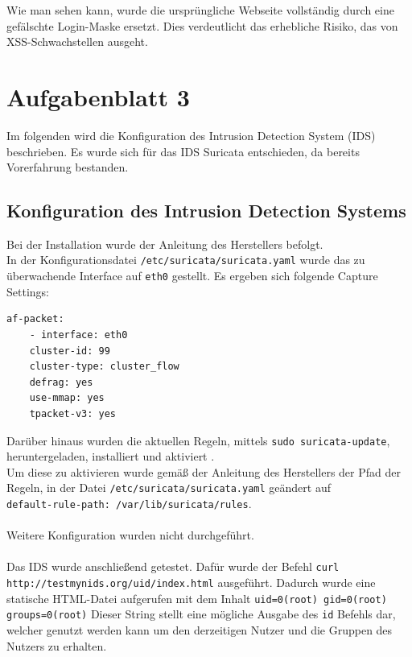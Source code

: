 \documentclass[
    a4paper,
    pagesize,
	pdftex,
    12pt,
]{scrartcl}
\begin{document}
\noindent Wie man sehen kann, wurde die ursprüngliche Webseite vollständig durch eine gefälschte Login-Maske ersetzt. Dies verdeutlicht das erhebliche Risiko, das von XSS-Schwachstellen ausgeht.

\FloatBarrier

\newpage
\section{Aufgabenblatt 3}
Im folgenden wird die Konfiguration des Intrusion Detection System (IDS) beschrieben. Es wurde sich für das IDS Suricata entschieden, da bereits Vorerfahrung bestanden.

\subsection{Konfiguration des Intrusion Detection Systems}\label{config-ids}
Bei der Installation wurde der Anleitung des Herstellers \cite{suricata-quickstart} befolgt. \\
In der Konfigurationsdatei \lstinline[breaklines]|/etc/suricata/suricata.yaml| wurde das zu überwachende Interface auf \lstinline[breaklines]|eth0| gestellt. Es ergeben sich folgende Capture Settings:
\begin{lstlisting}[breaklines]
	af-packet:
	- interface: eth0
	cluster-id: 99
	cluster-type: cluster_flow
	defrag: yes
	use-mmap: yes
	tpacket-v3: yes
\end{lstlisting}
Darüber hinaus wurden die aktuellen Regeln,  mittels \lstinline[breaklines]|sudo suricata-update|, heruntergeladen, installiert und aktiviert \cite{suricata-rulemanagement}. \\
Um diese zu aktivieren wurde gemäß der Anleitung des Herstellers der Pfad der Regeln, in der Datei \lstinline[breaklines]|/etc/suricata/suricata.yaml| geändert auf \\ \lstinline[breaklines]|default-rule-path: /var/lib/suricata/rules|. \\ \\
Weitere Konfiguration wurden nicht durchgeführt. \\ \\
Das IDS wurde anschließend getestet. Dafür wurde der Befehl
\lstinline[breaklines]|curl http://testmynids.org/uid/index.html|
ausgeführt. Dadurch wurde eine statische HTML-Datei aufgerufen mit dem Inhalt 
\lstinline[breaklines]|uid=0(root) gid=0(root) groups=0(root)| 
Dieser String stellt eine mögliche Ausgabe des \lstinline[breaklines]|id| Befehls dar, welcher genutzt werden kann um den derzeitigen Nutzer und die Gruppen des Nutzers zu erhalten. \\ \\
\end{document}
